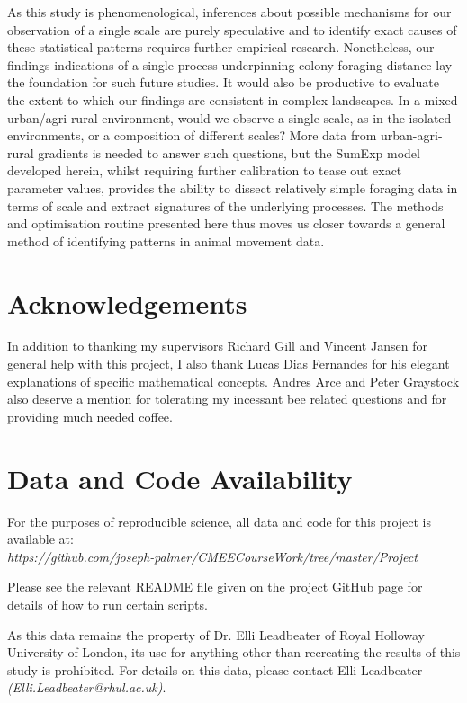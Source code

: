 \documentclass[11pt,usenames,dvipsnames,a4paper]{article}
\begin{document}
\begin{linenumbers}
As this study is phenomenological, inferences about possible mechanisms for our observation of a single scale are purely speculative and to identify exact causes of these statistical patterns requires further empirical research. Nonetheless, our findings indications of a single process underpinning colony foraging distance lay the foundation for such future studies. It would also be productive to evaluate the extent to which our findings are consistent in complex landscapes. In a mixed urban/agri-rural environment, would we observe a single scale, as in the isolated environments, or a composition of different scales? More data from urban-agri-rural gradients is needed to answer such questions, but the SumExp model developed herein, whilst requiring further calibration to tease out exact parameter values, provides the ability to dissect relatively simple foraging data in terms of scale and extract signatures of the underlying processes. The methods and optimisation routine presented here thus moves us closer towards a general method of identifying patterns in animal movement data.
\end{linenumbers}

\section{Acknowledgements}

In addition to thanking my supervisors Richard Gill and Vincent Jansen for general help with this project, I also thank Lucas Dias Fernandes for his elegant explanations of specific mathematical concepts. Andres Arce and Peter Graystock also deserve a mention for tolerating my incessant bee related questions and for providing much needed coffee.

\newpage
\section{Data and Code Availability}
For the purposes of reproducible science, all data and code for this project is available at:\\ \textit{https://github.com/joseph-palmer/CMEECourseWork/tree/master/Project}

\noindent
Please see the relevant README file given on the project GitHub page for details of how to run certain scripts.

\noindent
As this data remains the property of Dr. Elli Leadbeater of Royal Holloway University of London, its use for anything other than recreating the results of this study is prohibited. For details on this data, please contact Elli Leadbeater \textit{(Elli.Leadbeater@rhul.ac.uk)}.

\newpage



\end{document}
